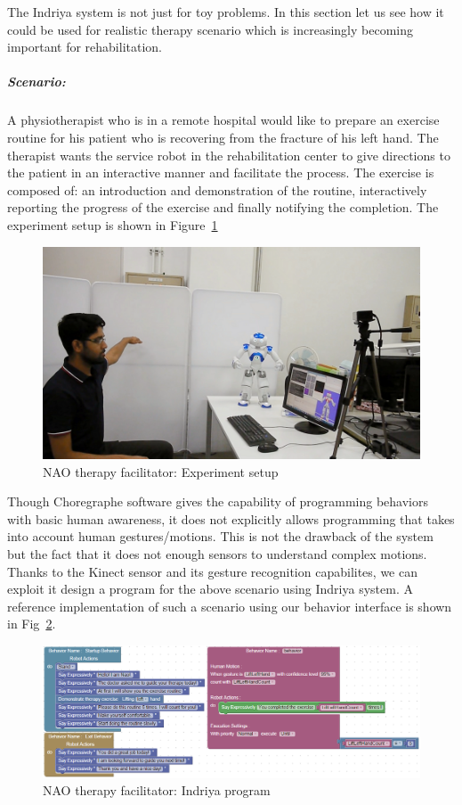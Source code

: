 The Indriya system is not just for toy problems. In this section let us see how it could be used for realistic therapy scenario which is increasingly becoming important for rehabilitation. 

\subparagraph{Scenario:} A physiotherapist who is in a remote hospital would like to prepare an exercise routine for his patient who is recovering from the fracture of his left hand. The therapist wants the service robot in the rehabilitation center to give directions to the patient in an interactive manner and facilitate the process. The exercise is composed of: an introduction and demonstration of the routine, interactively reporting the progress of the exercise and finally notifying the completion. The experiment setup is shown in Figure~\ref{fig:scenario2_setup}

\begin{figure}[H]
\centering
\includegraphics[width=\textwidth]{../thesis/assets/scenario_therapy.png}
\caption[NAO therapy facilitator: Experiment setup]{NAO therapy facilitator: Experiment setup}
\label{fig:scenario2_setup}
\end{figure}

Though Choregraphe software gives the capability of programming behaviors with basic human awareness, it does not explicitly allows programming that takes into account human gestures/motions. This is not the drawback of the system but the fact that it does not enough sensors to understand complex motions. Thanks to the Kinect sensor and its gesture recognition capabilites, we can exploit it design a program for the above scenario using Indriya system. A reference implementation of such a scenario using our behavior interface is shown in Fig~\ref{fig:scenario2_program}.

\begin{figure}[H]
\centering
\includegraphics[width=\textwidth]{../thesis/assets/scenario2_horizontal.png}
\caption[NAO therapy facilitator: Indriya program]{NAO therapy facilitator: Indriya program}
\label{fig:scenario2_program}
\end{figure}

